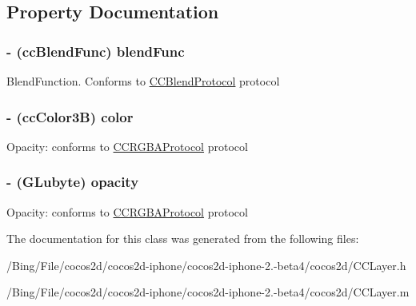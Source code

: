 \subsection{Property Documentation}
\hypertarget{interface_c_c_layer_color_a69f3fcf8b7afb0a9c0b0ae10dac690f1}{
\subsubsection[{blend\-Func}]{\setlength{\rightskip}{0pt plus 5cm}-\/ ({\bf cc\-Blend\-Func}) {\bf blend\-Func}}}\label{interface_c_c_layer_color_a69f3fcf8b7afb0a9c0b0ae10dac690f1}
Blend\-Function. Conforms to \hyperlink{protocol_c_c_blend_protocol-p}{C\-C\-Blend\-Protocol} protocol \hypertarget{interface_c_c_layer_color_ae3a34640db3336f78de9948081de990c}{
\subsubsection[{color}]{\setlength{\rightskip}{0pt plus 5cm}-\/ ({\bf cc\-Color3\-B}) {\bf color}}}\label{interface_c_c_layer_color_ae3a34640db3336f78de9948081de990c}
Opacity\-: conforms to \hyperlink{protocol_c_c_r_g_b_a_protocol-p}{C\-C\-R\-G\-B\-A\-Protocol} protocol \hypertarget{interface_c_c_layer_color_ad4f7cd76888fe08a03c5b2c540c0d781}{
\subsubsection[{opacity}]{\setlength{\rightskip}{0pt plus 5cm}-\/ (G\-Lubyte) {\bf opacity}}}\label{interface_c_c_layer_color_ad4f7cd76888fe08a03c5b2c540c0d781}
Opacity\-: conforms to \hyperlink{protocol_c_c_r_g_b_a_protocol-p}{C\-C\-R\-G\-B\-A\-Protocol} protocol 

The documentation for this class was generated from the following files\-:\begin{DoxyCompactItemize}
\item 
/\-Bing/\-File/cocos2d/cocos2d-\/iphone/cocos2d-\/iphone-\/2.-\/beta4/cocos2d/C\-C\-Layer.\-h\item 
/\-Bing/\-File/cocos2d/cocos2d-\/iphone/cocos2d-\/iphone-\/2.-\/beta4/cocos2d/C\-C\-Layer.\-m\end{DoxyCompactItemize}
